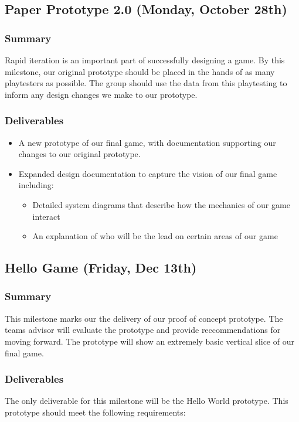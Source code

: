 \subsection{Paper Prototype 2.0 (Monday, October 28th)}

\subsubsection*{Summary}
Rapid iteration is an important part of successfully designing a game. By this
milestone, our original prototype should be placed in the hands of as many
playtesters as possible. The group should use the data from this playtesting to
inform any design changes we make to our prototype.

\subsubsection*{Deliverables}
\begin{itemize}
  \item A new prototype of our final game, with documentation supporting our
  changes to our original prototype.
  \item Expanded design documentation to capture the vision of our final game
  including:
  \begin{itemize}
    \item Detailed system diagrams that describe how the mechanics of our game
    interact
    \item An explanation of who will be the lead on certain areas of our game
  \end{itemize}
\end{itemize}

\subsection{Hello Game (Friday, Dec 13th)}

\subsubsection*{Summary}
This milestone marks our the delivery of our proof of concept prototype. The teams advisor will evaluate the prototype and provide reccommendations for moving forward. The prototype will show an extremely basic vertical slice of our final game. 

\subsubsection*{Deliverables}
The only deliverable for this milestone will be the Hello World prototype. This prototype should meet the following requirements:

